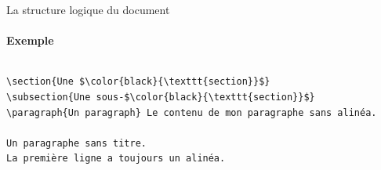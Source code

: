 \begin{frame}[fragile]{La structure logique du document}
  \framesubtitle{Exemple}
  \begin{columns}
    \begin{column}{0.5\textwidth}
      \begin{lstlisting}[style=nonumbers,mathescape]
\section{Une $\color{black}{\texttt{section}}$}
\subsection{Une sous-$\color{black}{\texttt{section}}$}
\paragraph{Un paragraph} Le contenu de mon paragraphe sans alinéa.

Un paragraphe sans titre.
La première ligne a toujours un alinéa.


\end{lstlisting}
\end{column}
\end{columns}
\end{frame}

